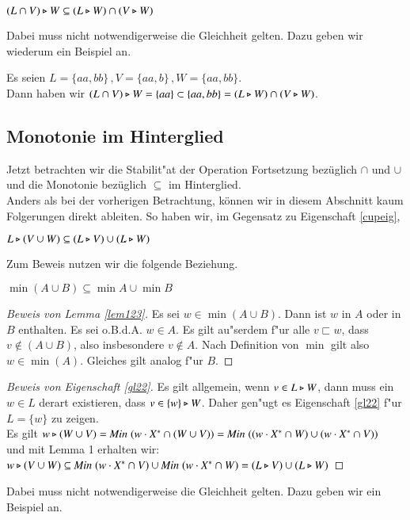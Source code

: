 \vspace{2ex}

\begin{eigen}
$(L\cap V) \triangleright W \subseteq (L\triangleright W) \cap (V\triangleright W)$
\end{eigen}
Dabei muss nicht notwendigerweise die Gleichheit gelten. Dazu geben wir wiederum ein Beispiel an.

\vspace{2ex}

\begin{beispiel}
Es seien $L= \{aa,bb\}\, ,V = \{aa,b\}\, ,W = \{aa,bb\}$. \\Dann haben wir $(L\cap V) \triangleright W = \{aa\} \subset \{aa,bb\} = (L\triangleright W) \cap (V\triangleright W)$.
\end{beispiel}

\subsection{Monotonie im Hinterglied}
Jetzt betrachten wir die Stabilit"at der Operation Fortsetzung bezüglich $\cap$ und $\cup$ und die Monotonie bezüglich $\subseteq$ im Hinterglied.\\
Anders als bei der vorherigen Betrachtung, können wir in diesem Abschnitt kaum Folgerungen direkt ableiten.
So haben wir, im Gegensatz zu Eigenschaft \ref{cupeig},

\vspace{2ex}

\begin{eigen}\label{gl22}
$L\triangleright (V\cup W)\subseteq (L\triangleright V) \cup (L\triangleright W)$
\end{eigen}
Zum Beweis nutzen wir die folgende Beziehung.

\vspace{2ex}

\begin{lem}\label{lem123}
$\min (A\cup B) \subseteq \min A \cup \min B$
\end{lem}

\begin{proof}[Beweis von Lemma \ref{lem123}]
Es sei $w\in \min (A\cup B)$. Dann ist $w$ in $A$ oder in $B$ enthalten. Es sei o.B.d.A. $w\in A$. Es gilt au"serdem f"ur alle $v\sqsubset w$, dass $v\notin (A\cup B)$, also insbesondere $v\notin A$. Nach Definition von $\min$ gilt also $w\in\min(A)$. Gleiches gilt analog f"ur $B$.
\end{proof}
\begin{proof}[Beweis von Eigenschaft \ref{gl22}]
Es gilt allgemein, wenn $v\in L\triangleright W$, dann muss ein $w\in L$ derart existieren, dass $v\in \{w\}\triangleright W$. 
Daher gen"ugt es Eigenschaft \ref{gl22} f"ur $L=\{w\}$ zu zeigen.\\
Es gilt $w \triangleright (W\cup V)=\mathit{Min}\; (w\cdot X^* \cap (W\cup V)) =\mathit{Min}\; ((w\cdot X^* \cap W) \cup (w\cdot X^* \cap V))$\\
und mit Lemma 1 erhalten wir:\\
$ w\triangleright (V\cup W) \subseteq \mathit{Min}\; (w\cdot X^* \cap V) \cup \mathit{Min}\; (w\cdot X^* \cap W)=(L\triangleright V)\cup (L\triangleright W)$
\end{proof}
Dabei muss nicht notwendigerweise die Gleichheit gelten. Dazu geben wir ein Beispiel an.

